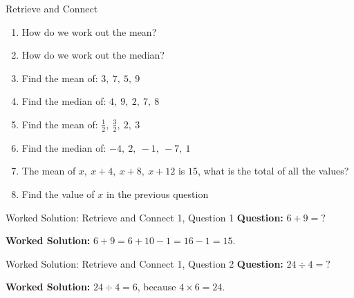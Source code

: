 \documentclass{beamer}
\newcommand{\ashow}[1]{\uncover<2->{\textcolor{red}{\small #1}}}
\newcommand{\ashowq}[1]{\alt<2->{\textcolor{red}{\small #1}}{?}}
\begin{document}
\begin{frame}{Retrieve and Connect}
\hypertarget{q-st1}{}
\vspace{-0.8em}

\footnotesize
\begin{enumerate}\itemsep2pt
  \item How do we work out the mean? \ashow{Add the values and divide by how many there are.}
  \item How do we work out the median? \ashow{Order the data and find the middle value.}
  \item Find the mean of: $3,\ 7,\ 5,\ 9$ \ashow{$=6$}
  \item Find the median of: $4,\ 9,\ 2,\ 7,\ 8$ \ashow{$=7$}
  \item Find the mean of: $\frac{1}{2},\ \frac{3}{2},\ 2,\ 3$ \ashow{$=\frac{7}{4}$}
  \item Find the median of: $-4,\ 2,\ -1,\ -7,\ 1$ \ashow{$=-1$}
  \item The mean of $x,\ x+4,\ x+8,\ x+12$ is $15$, what is the total of all the values? \ashow{$60$}
  \item Find the value of $x$ in the previous question \ashow{$x=9$}
\end{enumerate}

\end{frame}

\begin{frame}{Worked Solution: Retrieve and Connect 1, Question 1}
\hypertarget{work-st1}{}
\small
\textbf{Question:} \(6+9=\mathord{?}\)

\smallskip
\textbf{Worked Solution:} \(6+9=6+10-1=16-1=15\).
\end{frame}

\begin{frame}{Worked Solution: Retrieve and Connect 1, Question 2}
\small
\textbf{Question:} \(24 \div 4=\mathord{?}\)

\smallskip
\textbf{Worked Solution:} \(24 \div 4 = 6\), because \(4 \times 6 = 24\).
\end{frame}
\end{document}
